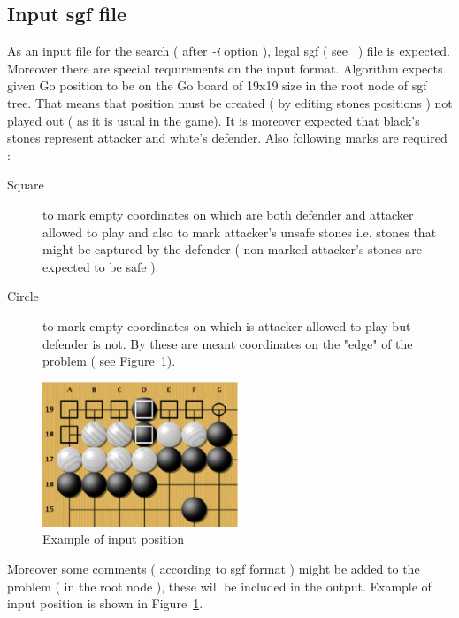 \subsection{Input sgf file}
\label{subsec:input_sgf_file}

As an input file for the search ( after {\it -i} option ), legal sgf ( see~\cite{web:sgf} ) file is expected. Moreover there are special requirements
on the input format. Algorithm expects given Go position to be on the Go board of 19x19 size in the root node of sgf tree. That means that position
must be created ( by editing stones positions ) not played out ( as it is usual in the game). It is moreover expected that black's stones represent
attacker and white's defender. Also following marks are required : 

\begin {description} 
	\item [Square] to mark empty coordinates on which are both defender and attacker allowed to play and also to mark attacker's unsafe stones i.e.
		stones that might be captured by the defender ( non marked attacker's stones are expected to be safe ).  
	\item [Circle] to mark empty coordinates on which is attacker allowed to play but defender is not. By these are meant coordinates on the "edge" of
		the problem ( see Figure~\ref{fig:input}). 
\end{description}

\begin{figure}
\begin{center}
\leavevmode
\includegraphics[width = 2.3in]{src/pics/input.eps} 
\caption{Example of input position \label{fig:input}}
\end{center}
\end{figure}

Moreover some comments ( according to sgf format ) might be added to the problem ( in the root node ), these will be included in the output. Example
of input position is shown in Figure~\ref{fig:input}. %


